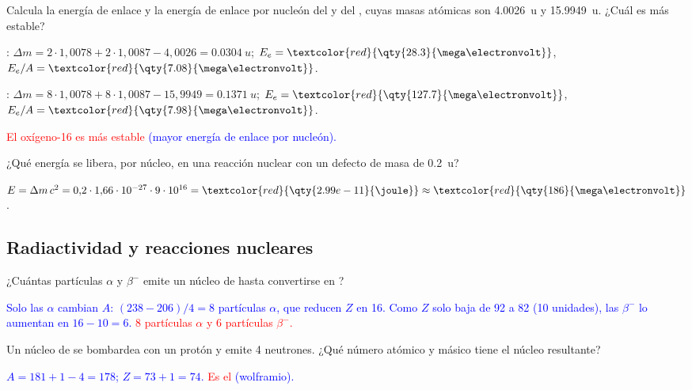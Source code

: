 \begin{exercise}
    Calcula la energía de enlace y la energía de enlace por nucleón del  y del , cuyas masas atómicas son
    \qty{4.0026}{u} y \qty{15.9949}{u}. ¿Cuál es más estable?
    \begin{solu}
        : \(\Delta m = 2\cdot 1{,}0078 + 2\cdot 1{,}0087 - 4{,}0026 = \qty{0.0304}{u}\); \(E_e = \textcolor{red}{\qty{28.3}{\mega\electronvolt}}\), \(E_e/A = \textcolor{red}{\qty{7.08}{\mega\electronvolt}}\).

        : \(\Delta m = 8\cdot 1{,}0078 + 8\cdot 1{,}0087 - 15{,}9949 = \qty{0.1371}{u}\); \(E_e = \textcolor{red}{\qty{127.7}{\mega\electronvolt}}\), \(E_e/A = \textcolor{red}{\qty{7.98}{\mega\electronvolt}}\).

        \textcolor{red}{El oxígeno-16 es más estable} \textcolor{blue}{(mayor energía de enlace por nucleón).}
    \end{solu}
\end{exercise}

\begin{exercise}
    ¿Qué energía se libera, por núcleo, en una reacción nuclear con un defecto de masa de \qty{0.2}{u}?
    \begin{solu}
        \(E = \Delta m\,c^2 = 0{,}2\cdot 1{,}66\cdot 10^{-27}\cdot 9\cdot 10^{16} = \textcolor{red}{\qty{2.99e-11}{\joule}} \approx \textcolor{red}{\qty{186}{\mega\electronvolt}}\).
    \end{solu}
\end{exercise}

\subsection{Radiactividad y reacciones nucleares}

\begin{exercise}
    ¿Cuántas partículas \(\alpha\) y \(\beta^-\) emite un núcleo de  hasta convertirse en ?
    \begin{solu}
        \textcolor{blue}{Solo las \(\alpha\) cambian \(A\): \((238 - 206)/4 = 8\) partículas \(\alpha\), que reducen \(Z\) en 16. Como \(Z\) solo baja de 92 a 82 (10
        unidades), las \(\beta^-\) lo aumentan en \(16 - 10 = 6\).} \textcolor{red}{8 partículas \(\alpha\) y 6 partículas \(\beta^-\).}
    \end{solu}
\end{exercise}

\begin{exercise}
    Un núcleo de  se bombardea con un protón y emite 4 neutrones. ¿Qué número atómico y másico tiene el núcleo resultante?
    \begin{solu}
        \textcolor{blue}{\(A = 181 + 1 - 4 = 178\); \(Z = 73 + 1 = 74\).} \textcolor{red}{Es el } \textcolor{blue}{(wolframio).}
    \end{solu}
\end{exercise}


